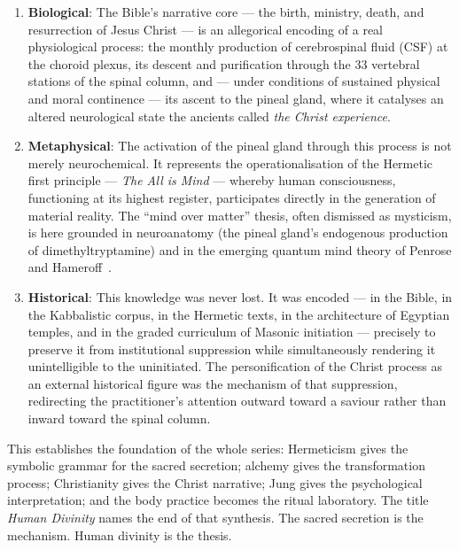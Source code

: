 \documentclass[12pt, a4paper]{article}
\begin{document}
\begin{enumerate}[label=\textbf{\arabic*.}]
  \item \textbf{Biological}: The Bible's narrative core — the birth, ministry,
  death, and resurrection of Jesus Christ — is an allegorical encoding of a
  real physiological process: the monthly production of cerebrospinal fluid
  (CSF) at the choroid plexus, its descent and purification through the 33
  vertebral stations of the spinal column, and — under conditions of
  sustained physical and moral continence — its ascent to the pineal gland,
  where it catalyses an altered neurological state the ancients called
  \emph{the Christ experience}.

  \item \textbf{Metaphysical}: The activation of the pineal gland through this
  process is not merely neurochemical. It represents the operationalisation of
  the Hermetic first principle — \emph{The All is Mind} — whereby human
  consciousness, functioning at its highest register, participates directly in
  the generation of material reality. The ``mind over matter'' thesis, often
  dismissed as mysticism, is here grounded in neuroanatomy (the pineal gland's
  endogenous production of dimethyltryptamine) and in the emerging quantum
  mind theory of Penrose and Hameroff~\autocite{hameroff2014}.

  \item \textbf{Historical}: This knowledge was never lost. It was encoded —
  in the Bible, in the Kabbalistic corpus, in the Hermetic texts, in the
  architecture of Egyptian temples, and in the graded curriculum of Masonic
  initiation — precisely to preserve it from institutional suppression while
  simultaneously rendering it unintelligible to the uninitiated. The
  personification of the Christ process as an external historical figure was
  the mechanism of that suppression, redirecting the practitioner's attention
  outward toward a saviour rather than inward toward the spinal column.
\end{enumerate}

This establishes the foundation of the whole series: Hermeticism gives the
symbolic grammar for the sacred secretion; alchemy gives the transformation
process; Christianity gives the Christ narrative; Jung gives the psychological
interpretation; and the body practice becomes the ritual laboratory. The title
\emph{Human Divinity} names the end of that synthesis. The sacred secretion is
the mechanism. Human divinity is the thesis.
\end{document}
